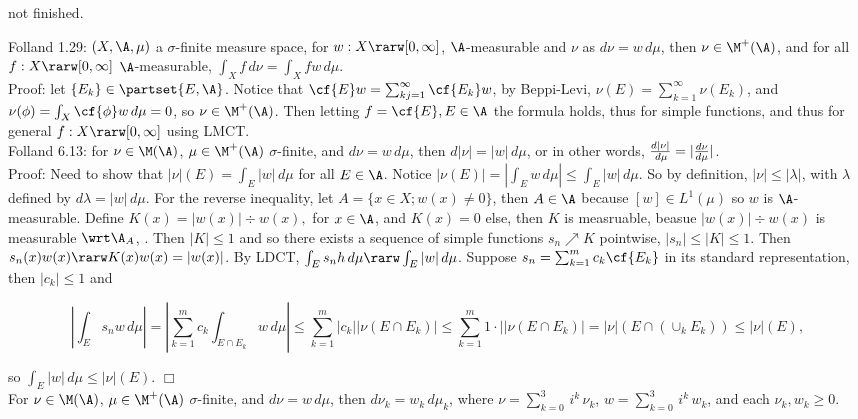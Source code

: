 \noindent
not finished.




\break

Folland 1.29: $(X ,\A, \mu)$ a $\sigma$-finite measure space, for $w: X \rarw [0,\infty]$, $\A$-measurable and $\nu$ as $d\nu = w \, d\mu $, then $\nu \in \M^+(\A)$, and for all $f:X \rarw [0, \infty]$ $\A$-measurable, $\int_X f\, d\nu = \int_X fw \, d\mu$. \\

\noindent
Proof: let $\{E_k\} \in \partset{E, \A}$. Notice that $\cf{E} w = \sum_{kj=1}^\infty \cf{E_k} w$, by Beppi-Levi, $\nu(E) = \sum_{k=1}^\infty \nu(E_k)$, and $\nu(\phi) = \int_X \cf{\phi} w \, d\mu = 0$, so $\nu \in \M^+(\A)$. Then letting $f = \cf{E}, E \in \A$ the formula  holds, thus for simple functions, and thus for general $f:X \rarw [0, \infty]$ using LMCT.\\



Folland 6.13: for $\nu \in \M(\A)$, $\mu \in \M^+(\A)$ $\sigma$-finite, and $d\nu = w \, d\mu$, then $d|\nu| = |w| \, d\mu$, or in other words, $\frac{d|\nu|}{\\d\mu} = |\frac{d\nu}{d\mu}|$. \\

\noindent
Proof: Need to show that $|\nu|(E) = \int_E |w| \, d\mu$ for all $E \in \A$. Notice $|\nu(E)| = |\int_E w \, d\mu| \le \int_E |w| \, d\mu$. So by definition, $|\nu| \le |\lambda|$, with $\lambda$ defined by $d\lambda = |w| \, d\mu$. For the reverse inequality, let $A = \{x \in X; w(x) \not = 0 \}$, then $A \in \A$ because $[w] \in L^1(\mu)$ so $w$ is $\A$-measurable. Define $K(x) = |w(x)| \div w(x),$ for $x \in \A$, and $K(x) = 0$ else, then $K$ is measruable, beasue $ |w(x)| \div w(x) $ is measurable $\wrt \A_A$, . Then $|K| \le 1$ and so there exists a sequence of simple functions $s_n \nearrow K$ pointwise, $|s_n| \le |K| \le 1$. Then $s_n(x) w(x) \rarw K(x) w(x) = |w(x)|$. By LDCT, $\int_E s_n h \, d\mu \rarw \int_E |w| \, d\mu$. Suppose $s_n = \sum_{k=1}^m c_k \cf{E_k}$ in its standard representation, then $|c_k| \le 1$ and 

$$
|\int_E s_n w \, d\mu | = |\sum_{k=1}^m c_k \int_{E \cap E_k} w \, d\mu| \le \sum_{k=1}^m |c_k| |\nu(E \cap E_k)|  \le \sum_{k=1}^m 1 \cdot| |\nu(E \cap E_k)| = |\nu|(E \cap (\cup_k E_k)) \le |\nu|(E),
$$

\noindent
so $\int_E |w| \, d\mu \le |\nu|(E)$. $\Box$\\

For $\nu \in \M(\A)$, $\mu \in \M^+(\A)$ $\sigma$-finite, and $d\nu = w \, d\mu$, then $d\nu_k = w_k \, d\mu_k$, where $\nu = \sum_{k=0}^3 \, i^k \, \nu_k$, $w = \sum_{k=0}^3 \, i^k \, w_k$, and each $\nu_k , w_k \ge 0$. \\

